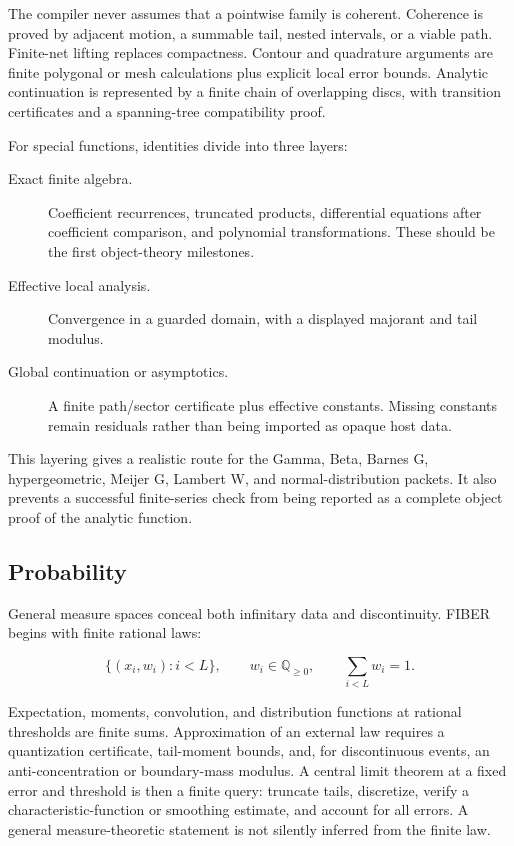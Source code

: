 The compiler never assumes that a pointwise family is coherent.  Coherence is
proved by adjacent motion, a summable tail, nested intervals, or a viable path.
Finite-net lifting replaces compactness.  Contour and quadrature arguments are
finite polygonal or mesh calculations plus explicit local error bounds.
Analytic continuation is represented by a finite chain of overlapping discs,
with transition certificates and a spanning-tree compatibility proof.

For special functions, identities divide into three layers:

\begin{description}
\item[Exact finite algebra.] Coefficient recurrences, truncated products,
      differential equations after coefficient comparison, and polynomial
      transformations.  These should be the first object-theory milestones.
\item[Effective local analysis.] Convergence in a guarded domain, with a
      displayed majorant and tail modulus.
\item[Global continuation or asymptotics.] A finite path/sector certificate
      plus effective constants.  Missing constants remain residuals rather
      than being imported as opaque host data.
\end{description}

This layering gives a realistic route for the Gamma, Beta, Barnes G,
hypergeometric, Meijer G, Lambert W, and normal-distribution packets.  It also
prevents a successful finite-series check from being reported as a complete
object proof of the analytic function.

\subsection{Probability}

General measure spaces conceal both infinitary data and discontinuity.
FIBER begins with finite rational laws:

\[
   \{(x_i,w_i):i<L\},\qquad w_i\in\mathbb Q_{\ge0},
   \qquad \sum_{i<L}w_i=1.
\]

Expectation, moments, convolution, and distribution functions at rational
thresholds are finite sums.  Approximation of an external law requires a
quantization certificate, tail-moment bounds, and, for discontinuous events,
an anti-concentration or boundary-mass modulus.  A central limit theorem at a
fixed error and threshold is then a finite query: truncate tails, discretize,
verify a characteristic-function or smoothing estimate, and account for all
errors.  A general measure-theoretic statement is not silently inferred from
the finite law.

